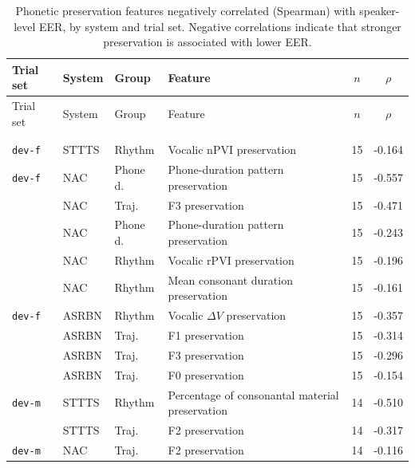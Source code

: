 \documentclass[12pt,leqno,a4paper]{article}
\begin{document}
\setlength{\LTcapwidth}{\linewidth}

\begingroup
\scriptsize
\setlength{\tabcolsep}{3pt}
\renewcommand{\arraystretch}{1.08}

\begin{longtable}{p{1.2cm}p{1.2cm}p{1.3cm}p{7.2cm}cc}
\hline
Trial set & System & Group & Feature & $n$ & $\rho$ \\
\hline
\endfirsthead

\hline
Trial set & System & Group & Feature & $n$ & $\rho$ \\
\hline
\endhead

\hline
\endfoot

\hline
\\
\caption{Phonetic preservation features negatively correlated (Spearman) with speaker-level EER, by system and trial set. Negative correlations indicate that stronger preservation is associated with lower EER.}
\label{tab:negative_preservation_feature_eer}\\[0.8em]
\endlastfoot

\hline
\texttt{dev-f} & STTTS & Rhythm & Vocalic nPVI preservation & 15 & -0.164 \\

\hline
\texttt{dev-f} & NAC & Phone d. & Phone-duration pattern preservation & 15 & -0.557 \\
 & NAC & Traj. & F3 preservation & 15 & -0.471 \\
 & NAC & Phone d. & Phone-duration pattern preservation & 15 & -0.243 \\
 & NAC & Rhythm &  Vocalic rPVI preservation & 15 & -0.196 \\
 & NAC & Rhythm & Mean consonant duration preservation & 15 & -0.161 \\

\hline
\texttt{dev-f} & ASRBN & Rhythm & Vocalic $\Delta V$ preservation & 15 & -0.357 \\
 & ASRBN & Traj. & F1 preservation & 15 & -0.314 \\
 & ASRBN & Traj. & F3 preservation & 15 & -0.296 \\
 & ASRBN & Traj. & F0 preservation & 15 & -0.154 \\

\hline
\texttt{dev-m} & STTTS & Rhythm & Percentage of consonantal material preservation & 14 & -0.510 \\
 & STTTS & Traj. & F2 preservation & 14 & -0.317 \\

\hline
\texttt{dev-m} & NAC & Traj. & F2 preservation & 14 & -0.116 \\


\end{longtable}
\end{document}

